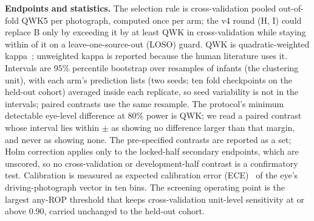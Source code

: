 \documentclass[journal]{IEEEtran}
\begin{document}
\textbf{Endpoints and statistics.} The selection rule is cross-validation pooled out-of-fold QWK5 per photograph, computed once per arm; the v4 round (H, I) could replace B only by exceeding it by at least \marginCV{} QWK in cross-validation while staying within \marginLOSO{} of it on a leave-one-source-out (LOSO) guard. QWK is quadratic-weighted kappa~\cite{cohen1968}; unweighted kappa is reported because the human literature uses it. Intervals are 95\% percentile bootstrap over \nReps{} resamples of infants (the clustering unit), with each arm's prediction lists (two seeds; ten fold checkpoints on the held-out cohort) averaged inside each replicate, so seed variability is not in the intervals; paired contrasts use the same resample. The protocol's minimum detectable eye-level difference at 80\% power is \mdd{} QWK; we read a paired contrast whose interval lies within $\pm$\mdd{} as showing no difference larger than that margin, and never as showing none. The \nPairs{} pre-specified contrasts are reported as a set; Holm correction applies only to the locked-half secondary endpoints, which are unscored, so no cross-validation or development-half contrast is a confirmatory test. Calibration is measured as expected calibration error (ECE)~\cite{guo2017} of the eye's driving-photograph vector in ten bins. The screening operating point is the largest any-ROP threshold that keeps cross-validation unit-level sensitivity at or above 0.90, carried unchanged to the held-out cohort.
\end{document}
